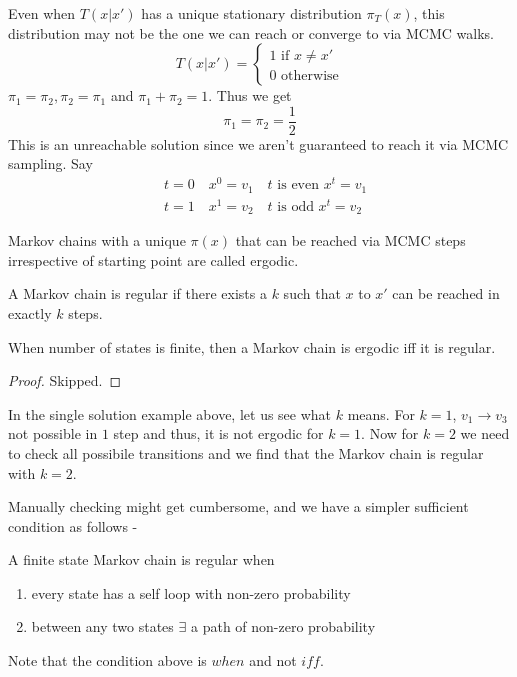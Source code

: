 \begin{exmp}
Even when $T(x|x')$ has a unique stationary distribution $\pi_T(x)$, this distribution may not be the one we can reach or converge to via MCMC walks.
\[
T(x|x' ) = \begin{cases}
	1 \text{ if } x \neq x' \\
	0 \text{ otherwise}
\end{cases}
\]
$\pi_1 = \pi_2, \pi_2 = \pi_1$ and $\pi_ 1 + \pi_2 = 1$. Thus we get
\[\pi_1 = \pi_2 = \frac{1}{2}\]
This is an unreachable solution since we aren't guaranteed to reach it via MCMC sampling. Say
\begin{align*}
	&t = 0 \quad x^0 = v_1 \quad t \text{ is even } x^t = v_1 \\
	&t = 1 \quad x^1 = v_2 \quad t\text{ is odd } x^t = v_2
\end{align*}
\end{exmp}
\begin{defn}[Ergodicity]
Markov chains with a unique $\pi(x)$ that can be reached via MCMC steps irrespective of starting point are called ergodic.
\end{defn}
\begin{defn}[Regular]
A Markov chain is regular if there exists a $k$ such that $x$ to $x'$ can be reached in exactly $k$ steps.
\end{defn}
\begin{thm}
When number of states is finite, then a Markov chain is ergodic iff it is regular.
\end{thm}
\begin{proof}
Skipped.
\end{proof}
\begin{exmp}
In the single solution example above, let us see what $k$ means. For $k=1$, $v_1 \to v_3$ not possible in $1$ step and thus, it is not ergodic for $k=1$. Now for $k = 2$ we need to check all possibile transitions and we find that the Markov chain is regular with $k=2$.
\end{exmp}
Manually checking might get cumbersome, and we have a simpler sufficient condition as follows - 
\begin{lem}
A finite state Markov chain is regular when 
\begin{enumerate}
	\item every state has a self loop with non-zero probability
	\item between any two states $\exists$ a path of non-zero probability
\end{enumerate}
\end{lem}
Note that the condition above is $when$ and not $iff$. 

